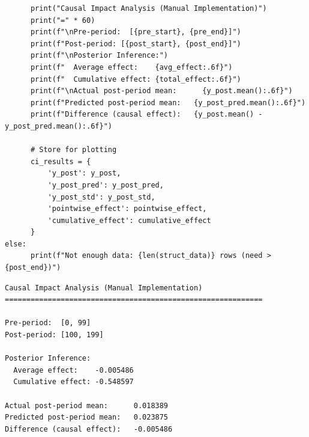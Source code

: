 \begin{verbatim}
      print("Causal Impact Analysis (Manual Implementation)")                                       
      print("=" * 60)                                                                               
      print(f"\nPre-period:  [{pre_start}, {pre_end}]")                                             
      print(f"Post-period: [{post_start}, {post_end}]")                                             
      print(f"\nPosterior Inference:")                                                              
      print(f"  Average effect:    {avg_effect:.6f}")                                               
      print(f"  Cumulative effect: {total_effect:.6f}")                                             
      print(f"\nActual post-period mean:      {y_post.mean():.6f}")                                 
      print(f"Predicted post-period mean:   {y_post_pred.mean():.6f}")                              
      print(f"Difference (causal effect):   {y_post.mean() - y_post_pred.mean():.6f}")              
                                                                                                    
      # Store for plotting                                                                          
      ci_results = {                                                                                
          'y_post': y_post,                                                                         
          'y_post_pred': y_post_pred,                                                               
          'y_post_std': y_post_std,                                                                 
          'pointwise_effect': pointwise_effect,                                                     
          'cumulative_effect': cumulative_effect                                                    
      }                                                                                             
else:                                                                                             
      print(f"Not enough data: {len(struct_data)} rows (need > {post_end})")
\end{verbatim}

\begin{verbatim}
Causal Impact Analysis (Manual Implementation)
============================================================

Pre-period:  [0, 99]
Post-period: [100, 199]

Posterior Inference:
  Average effect:    -0.005486
  Cumulative effect: -0.548597

Actual post-period mean:      0.018389
Predicted post-period mean:   0.023875
Difference (causal effect):   -0.005486
\end{verbatim}

